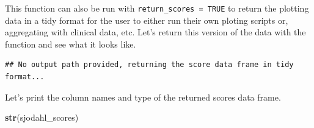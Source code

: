 \documentclass[
]{article}
\newenvironment{Shaded}{\begin{snugshade}}{\end{snugshade}}
\newcommand{\FunctionTok}[1]{\textcolor[rgb]{0.13,0.29,0.53}{\textbf{#1}}}
\newcommand{\NormalTok}[1]{#1}
\begin{document}
This function can also be run with \texttt{return\_scores\ =\ TRUE} to
return the plotting data in a tidy format for the user to either run
their own ploting scripts or, aggregating with clinical data, etc. Let's
return this version of the data with the function and see what it looks
like.

\begin{verbatim}
## No output path provided, returning the score data frame in tidy format...
\end{verbatim}

Let's print the column names and type of the returned scores data frame.

\begin{Shaded}
\begin{Highlighting}[]
\FunctionTok{str}\NormalTok{(sjodahl\_scores)}
\end{Highlighting}
\end{Shaded}
\end{document}
